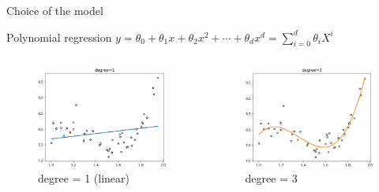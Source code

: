 \documentclass[handout, 10pt]{beamer}
\begin{document}
\begin{frame}{Choice of the model}
\begin{block}{Polynomial regression}
$y=\theta_0 + \theta_1 x + \theta_2 x^2 + \cdots + \theta_d x^d = \sum_{i=0}^d \theta_i X^i$
\end{block}
\begin{columns}
\pause
    \begin{figure}
    \caption*{degree = 1 (linear)}
    \includegraphics[width=\textwidth]{fig/L1/interp-pol-1.png}
    \end{figure}
\pause
    \begin{figure}
    \caption*{degree = 3 }
    \includegraphics[width=\textwidth]{fig/L1/interp-pol-3.png}

\end{figure}
\end{columns}
\end{frame}
\end{document}
